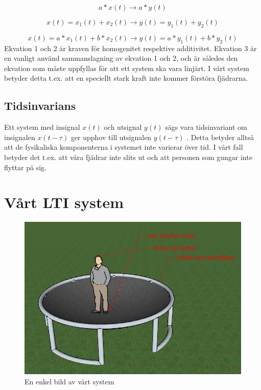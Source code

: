 \documentclass[10pt,a4paper]{article}
\begin{document}
\begin{equation}
a*x(t) \rightarrow a*y(t) 
\end{equation}

\begin{equation}
x(t) = x_1(t) + x_2(t) \rightarrow y(t) = y_1(t) + y_2(t)
\end{equation}

\begin{equation}
x(t) = a*x_1(t) + b*x_2(t)\rightarrow y(t) = a*y_1(t) + b*y_2(t)
\end{equation}
\linebreak
Ekvation 1 och 2 är kraven för homogenitet respektive additivitet. Ekvation 3 är en vanligt använd sammanslagning av ekvation 1 och 2, och är således den ekvation som måste uppfyllas för att ett system ska vara linjärt. \cite{sune2000}
I vårt system betyder detta t.ex. att en speciellt stark kraft inte kommer förstöra fjädrarna.


\subsection{Tidsinvarians}


Ett system med insignal $x(t)$ och utsignal $y(t)$ sägs vara tidsinvariant om insignalen $x(t - \tau)$ ger upphov till utsignalen $y(t - \tau)$ \cite{sune2000}. Detta betyder alltså att de fysikaliska komponenterna i systemet inte varierar över tid. I vårt fall betyder det t.ex. att våra fjädrar inte slits ut och att personen som gungar inte flyttar på sig. 

\newpage
\section{Vårt LTI system}

\begin{figure}[ht]
\caption{En enkel bild av vårt system}
\includegraphics[scale=0.8]{Bild2}
\end{figure}
\clearpage
\end{document}
